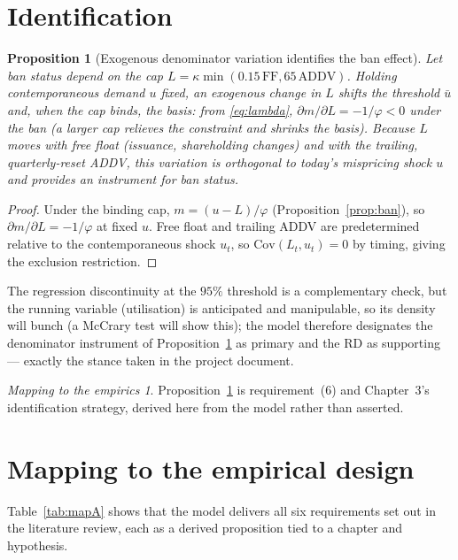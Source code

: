 \documentclass[11pt,a4paper]{article}
\theoremstyle{plain}
\newtheorem{proposition}{Proposition}
\theoremstyle{definition}
\theoremstyle{remark}
\newtheorem*{takeaway}{Mapping to the empirics}
\begin{document}
\section{Identification}\label{sec:id}
\begin{proposition}[Exogenous denominator variation identifies the ban effect]\label{prop:id}
Let ban status depend on the cap $L=\kappa\min(0.15\,\mathrm{FF},65\,\mathrm{ADDV})$. Holding contemporaneous demand $u$ fixed, an exogenous change in $L$ shifts the threshold $\bar u$ and, when the cap binds, the basis: from \eqref{eq:lambda}, $\partial m/\partial L = -1/\varphi<0$ under the ban (a larger cap relieves the constraint and shrinks the basis). Because $L$ moves with free float (issuance, shareholding changes) and with the \emph{trailing, quarterly-reset} ADDV, this variation is orthogonal to today's mispricing shock $u$ and provides an instrument for ban status.
\end{proposition}
\begin{proof}
Under the binding cap, $m=(u-L)/\varphi$ (Proposition~\ref{prop:ban}), so $\partial m/\partial L=-1/\varphi$ at fixed $u$. Free float and trailing ADDV are predetermined relative to the contemporaneous shock $u_t$, so $\mathrm{Cov}(L_t,u_t)=0$ by timing, giving the exclusion restriction.
\end{proof}

The regression discontinuity at the $95\%$ threshold is a complementary check, but the running variable (utilisation) is anticipated and manipulable, so its density will bunch (a McCrary test will show this); the model therefore designates the denominator instrument of Proposition~\ref{prop:id} as primary and the RD as supporting --- exactly the stance taken in the project document.

\begin{takeaway}
Proposition~\ref{prop:id} is requirement~(6) and Chapter~3's identification strategy, derived here from the model rather than asserted.
\end{takeaway}

\section{Mapping to the empirical design}\label{sec:map}
Table~\ref{tab:mapA} shows that the model delivers all six requirements set out in the literature review, each as a derived proposition tied to a chapter and hypothesis.
\end{document}
